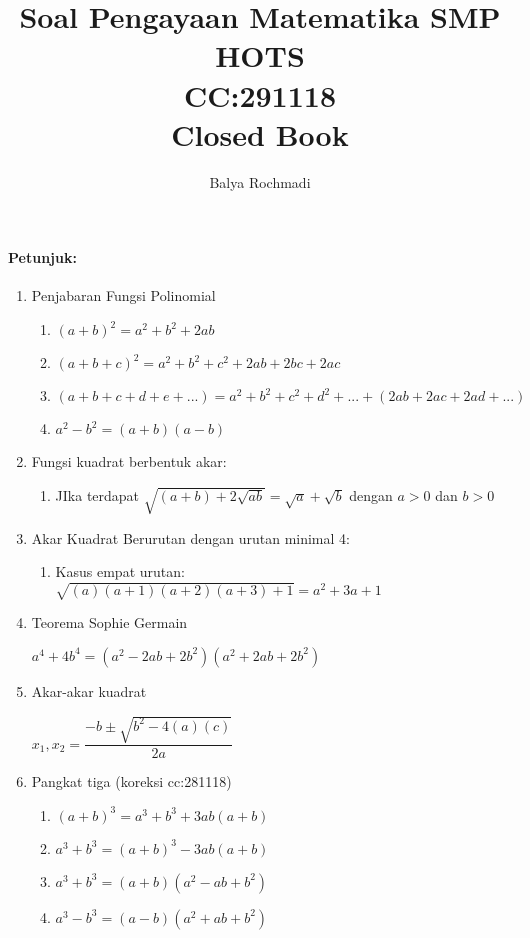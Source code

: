 \documentclass[12pt,a4paper,draft,final,oneside,twoside,openright,openany]{article}
\author{Balya Rochmadi}
\title{Soal Pengayaan Matematika SMP HOTS \\CC:291118 \\
	Closed Book}
\begin{document}
		\maketitle
		\Large
		\noindent\makebox[\linewidth]{\rule{\paperwidth}{0.4pt}}
		\paragraph{Petunjuk:}
		\begin{enumerate}
			\item Penjabaran Fungsi Polinomial
			\begin{enumerate}
				\item $(a+b)^2=a^2+b^2+2ab$
				\item $(a+b+c)^2=a^2+b^2+c^2+2ab+2bc+2ac$
				\item $(a+b+c+d+e+...)=a^2+b^2+c^2+d^2+...+(2ab+2ac+2ad+...)$
				\item $a^2-b^2=(a+b)(a-b)$
			\end{enumerate}	
			\item Fungsi kuadrat berbentuk akar:
			\begin{enumerate}
				\item JIka terdapat $\sqrt{(a+b)+2\sqrt{ab}}=\sqrt{a}+\sqrt{b}$ dengan $a>0$ dan $b>0$
			\end{enumerate}
			\item Akar Kuadrat Berurutan dengan urutan minimal 4:
			\begin{enumerate}
				\item Kasus empat urutan:
				$\sqrt{(a)(a+1)(a+2)(a+3)+1}=a^2+3a+1$
			\end{enumerate}
			\item Teorema Sophie Germain 
			\begin{center}
				$a^4+4b^4=(a^2-2ab+2b^2)(a^2+2ab+2b^2)$
			\end{center}
			\item Akar-akar kuadrat
			\begin{center}
				$x_1,x_2=\dfrac{-b \pm \sqrt{b^2-4(a)(c)}}{2a}$
			\end{center}
			\item Pangkat tiga (koreksi cc:281118)
				\begin{enumerate}
					\item $(a+b)^3=a^3+b^3+3ab(a+b)$
					\item $a^3+b^3=(a+b)^3-3ab(a+b)$
					\item $a^3+b^3=(a+b)(a^2-ab+b^2)$
					\item $a^3-b^3=(a-b)(a^2+ab+b^2)$

\end{enumerate}
\end{enumerate}
\end{document}
